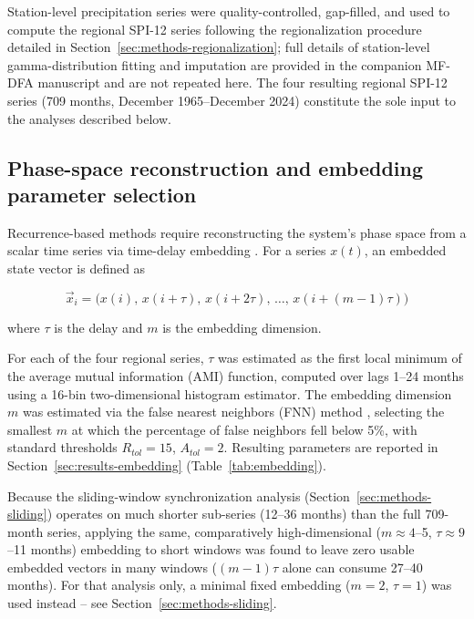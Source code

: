 \documentclass[climate,article,submit,moreauthors]{Definitions/mdpi}
\begin{document}
Station-level precipitation series were quality-controlled, gap-filled, and used to
compute the regional SPI-12 series following the regionalization procedure detailed
in Section~\ref{sec:methods-regionalization}; full details of station-level
gamma-distribution fitting and imputation are provided in the companion MF-DFA
manuscript and are not repeated here. The four resulting regional SPI-12 series
(709 months, December 1965--December 2024) constitute the sole input to the
analyses described below.

\subsection{Phase-space reconstruction and embedding parameter selection}
\label{sec:methods-embedding}

Recurrence-based methods require reconstructing the system's phase space from a
scalar time series via time-delay embedding \cite{Takens1981}. For a series
$x(t)$, an embedded state vector is defined as

\begin{equation}
\vec{x}_i = \big(x(i),\, x(i+\tau),\, x(i+2\tau),\, \dots,\, x(i+(m-1)\tau)\big)
\label{eq:embedding}
\end{equation}

where $\tau$ is the delay and $m$ is the embedding dimension.

For each of the four regional series, $\tau$ was estimated as the first local
minimum of the average mutual information (AMI) function, computed over lags
1--24 months using a 16-bin two-dimensional histogram estimator. The embedding
dimension $m$ was estimated via the false nearest neighbors (FNN) method
\cite{Kennel1992}, selecting the smallest $m$ at which the percentage of false
neighbors fell below 5\%, with standard thresholds $R_{tol}=15$, $A_{tol}=2$.
Resulting parameters are reported in Section~\ref{sec:results-embedding}
(Table~\ref{tab:embedding}).

Because the sliding-window synchronization analysis
(Section~\ref{sec:methods-sliding}) operates on much shorter sub-series
(12--36 months) than the full 709-month series, applying the same, comparatively
high-dimensional ($m\approx4$--5, $\tau\approx9$--11 months) embedding to short
windows was found to leave zero usable embedded vectors in many windows
($(m-1)\tau$ alone can consume 27--40 months). For that analysis only, a minimal
fixed embedding ($m=2$, $\tau=1$) was used instead --
see Section~\ref{sec:methods-sliding}.
\end{document}
